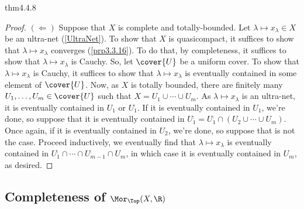 \begin{thm}{}{thm4.4.8}
\begin{proof}
\blankline
\noindent
$(\Leftarrow)$ Suppose that $X$ is complete and totally-bounded.  Let $\lambda \mapsto x_{\lambda}\in X$ be an ultra-net (\cref{UltraNet}).  To show that $X$ is quasicompact, it suffices to show that $\lambda \mapsto x_{\lambda}$ converges (\cref{prp3.3.16}).  To do that, by completeness, it suffices to show that $\lambda \mapsto x_{\lambda}$ is Cauchy.  So, let $\cover{U}$ be a uniform cover.  To show that $\lambda \mapsto x_{\lambda}$ is Cauchy, it suffices to show that $\lambda \mapsto x_{\lambda}$ is eventually contained in some element of $\cover{U}$.  Now, as $X$ is totally bounded, there are finitely many $U_1,\ldots ,U_m\in \cover{U}$ such that $X=U_1\cup \cdots \cup U_m$.  As $\lambda \mapsto x_{\lambda}$ is an ultra-net, it is eventually contained in $U_1$ or $U_1^{\comp}$.  If it is eventually contained in $U_1$, we're done, so suppose that it is eventually contained in $U_1^{\comp}=U_1^{\comp}\cap (U_2\cup \cdots \cup U_m)$.  Once again, if it is eventually contained in $U_2$, we're done, so suppose that is not the case.  Proceed inductively, we eventually find that $\lambda \mapsto x_{\lambda}$ is eventually contained in $U_1^{\comp}\cap \cdots \cap U_{m-1}^{\comp}\cap U_m$, in which case it is eventually contained in $U_m$, as desired.
\end{proof}
\end{thm}

\subsection{Completeness of \texorpdfstring{$\Mor _{\Top}(X,\R )$}{MorTop(X,R)}}\label{sbs4.4.1}

